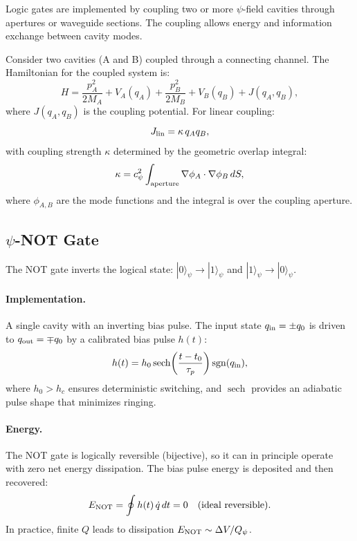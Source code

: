 \documentclass[12pt,a4paper,twoside]{article}
\begin{document}
Logic gates are implemented by coupling two or more $\psi$-field cavities through apertures or waveguide sections. The coupling allows energy and information exchange between cavity modes.

Consider two cavities (A and B) coupled through a connecting channel. The Hamiltonian for the coupled system is:
\begin{equation}
H = \frac{p_A^2}{2M_A} + V_A(q_A) + \frac{p_B^2}{2M_B} + V_B(q_B) + J(q_A, q_B),
\label{eq:coupled_ham}
\end{equation}
where $J(q_A, q_B)$ is the coupling potential. For linear coupling:
\begin{equation}
J_{\rm lin} = \kappa \, q_A q_B,
\label{eq:linear_coupling}
\end{equation}
with coupling strength $\kappa$ determined by the geometric overlap integral:
\begin{equation}
\kappa = c_\psi^2 \int_{\rm aperture} \nabla\phi_A \cdot \nabla\phi_B \, dS,
\label{eq:coupling_strength}
\end{equation}
where $\phi_{A,B}$ are the mode functions and the integral is over the coupling aperture.

\subsection{$\psi$-NOT Gate}\label{sec:not_gate}

The NOT gate inverts the logical state: $|0\rangle_\psi \to |1\rangle_\psi$ and $|1\rangle_\psi \to |0\rangle_\psi$.

\paragraph{Implementation.} A single cavity with an inverting bias pulse. The input state $q_{\rm in} = \pm q_0$ is driven to $q_{\rm out} = \mp q_0$ by a calibrated bias pulse $h(t)$:
\begin{equation}
h(t) = h_0 \operatorname{sech}\!\left(\frac{t - t_0}{\tau_p}\right) \operatorname{sgn}(q_{\rm in}),
\end{equation}
where $h_0 > h_c$ ensures deterministic switching, and $\operatorname{sech}$ provides an adiabatic pulse shape that minimizes ringing.

\paragraph{Energy.} The NOT gate is logically reversible (bijective), so it can in principle operate with zero net energy dissipation. The bias pulse energy is deposited and then recovered:
\begin{equation}
E_{\rm NOT} = \oint h(t)\,\dot{q}\,dt = 0 \quad \text{(ideal reversible)}.
\end{equation}
In practice, finite $Q$ leads to dissipation $E_{\rm NOT} \sim \Delta V / Q_\psi$.
\end{document}
